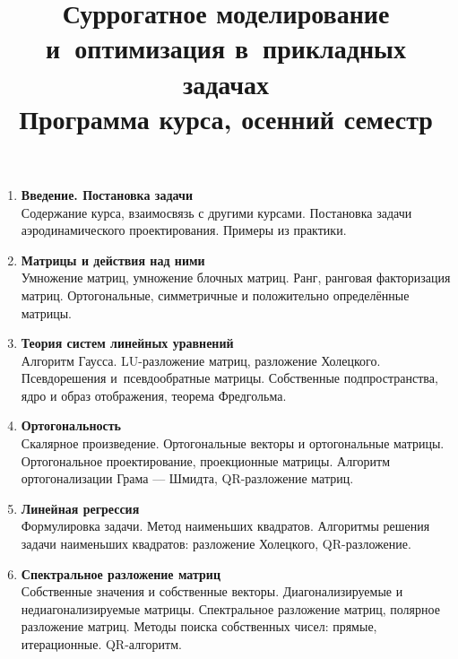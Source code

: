 \documentclass[12pt,oneside,openany]{article}
\begin{document}
\title{
  \large
  \textbf{Суррогатное моделирование и~оптимизация в~прикладных задачах} \\
  Программа курса, осенний семестр
}

\author{}
\date{}

\maketitle
\thispagestyle{empty}

\vspace{-10ex}


\begin{enumerate}

  \item \textbf{Введение. Постановка задачи} \\
  Содержание курса, взаимосвязь с другими курсами. Постановка задачи аэродинамического проектирования. Примеры из практики.

  \item \textbf{Матрицы и действия над ними} \\
  Умножение матриц, умножение блочных матриц. Ранг, ранговая факторизация матриц. Ортогональные, симметричные и положительно определённые матрицы.

  \item \textbf{Теория систем линейных уравнений} \\
  Алгоритм Гаусса. LU-разложение матриц, разложение Холецкого. Псевдорешения и~псевдообратные матрицы. Собственные подпространства, ядро и образ отображения, теорема Фредгольма.

  \item \textbf{Ортогональность} \\
  Скалярное произведение. Ортогональные векторы и ортогональные матрицы. Ортогональное проектирование, проекционные матрицы. Алгоритм ортогонализации Грама --- Шмидта, QR-разложение матриц.

  \item \textbf{Линейная регрессия} \\
  Формулировка задачи. Метод наименьших квадратов. Алгоритмы решения задачи наименьших квадратов: разложение Холецкого, QR-разложение.

  \item \textbf{Спектральное разложение матриц} \\
  Собственные значения и собственные векторы. Диагонализируемые и недиагонализируемые матрицы. Спектральное разложение матриц, полярное разложение матриц. Методы поиска собственных чисел: прямые, итерационные. QR-алгоритм.


\end{enumerate}
\end{document}
